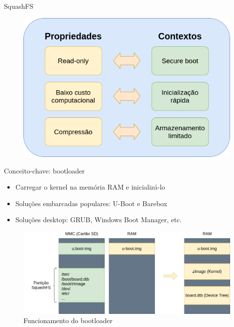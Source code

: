 \begin{frame}{SquashFS}
\begin{figure}
    \centering
    \includegraphics[scale=0.4]{figuras/squashfs_propriedades (1).png}
    \label{fig:my_label}
\end{figure}
\end{frame}

\begin{frame}{Conceito-chave: bootloader}
    \begin{itemize}
        \item Carregar o kernel na memória RAM e inicializá-lo
        \item Soluções embarcadas populares: U-Boot e Barebox
        \item Soluções desktop: GRUB, Windows Boot Manager, etc.
    \end{itemize}
    
    \begin{figure}
        \centering
        \includegraphics[scale=0.3]{figuras/bootloader.png}
        \caption{Funcionamento do bootloader}
        \label{fig:my_label}
    \end{figure}
\end{frame}

